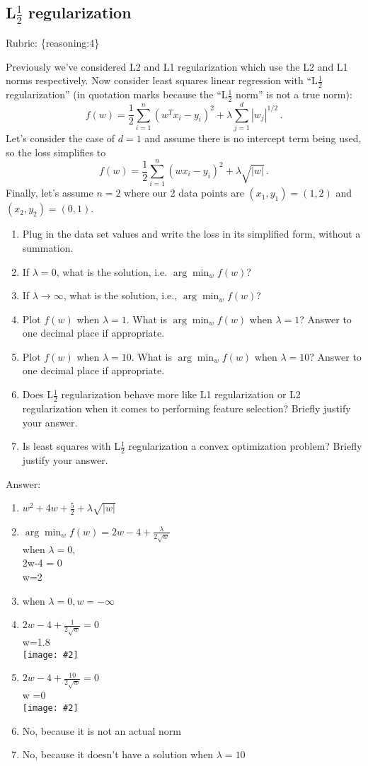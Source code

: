 \documentclass{article}
\def\rubric#1{\gre{Rubric: \{#1\}}}{}
\def\ans#1{\par\gre{Answer: #1}}
\def\gre#1{{\color{gre}#1}}
\newcommand{\fig}[2]{\texttt{[image: \#2]}}
\def\enum#1{\begin{enumerate}#1\end{enumerate}}
\begin{document}
\subsection{L$\frac12$ regularization}
\rubric{reasoning:4}

Previously we've considered L2 and L1 regularization which use the L2 and L1 norms respectively. Now consider
least squares linear regression with ``L$\frac12$ regularization'' (in quotation marks because the ``L$\frac12$ norm'' is not a true norm):
\[
f(w) = \frac{1}{2} \sum_{i=1}^n (w^Tx_i - y_i)^2 + \lambda \sum_{j=1}^d |w_j|^{1/2} \, .
\]
Let's consider the case of $d=1$ and
assume  there is no intercept term being used, so the loss simplifies to
\[
f(w) = \frac{1}{2} \sum_{i=1}^n (wx_i - y_i)^2 + \lambda \sqrt{|w|} \, .
\]
Finally, let's assume $n=2$
where our 2 data points are $(x_1,y_1)=(1,2)$ and $(x_2,y_2)=(0,1)$. 

\begin{enumerate}
\item Plug in the data set values and write the loss in its simplified form, without a summation.
\item If $\lambda=0$, what is the solution, i.e. $\arg \min_w f(w)$?
\item If $\lambda\rightarrow \infty$, what is the solution, i.e., $\arg \min_w f(w)$?
\item Plot $f(w)$ when $\lambda = 1$. What is $\arg \min_w f(w)$ when $\lambda=1$? Answer to one decimal place if appropriate.
\item Plot $f(w)$ when $\lambda = 10$. What is $\arg \min_w f(w)$ when $\lambda=10$? Answer to one decimal place if appropriate.
\item Does L$\frac12$ regularization behave more like L1 regularization or L2 regularization
when it comes to performing feature selection? Briefly justify your answer.
\item Is least squares with L$\frac12$ regularization 
a convex optimization problem? Briefly justify your answer.
\end{enumerate}


\ans{\enum{
		\item{$w^2+4w+\frac{5}{2}+\lambda\sqrt{|w|}$}
		\item{$\arg \min_w f(w) = 2w-4 + \frac{\lambda}{2\sqrt{w}}$\\
			when $\lambda=0$, \\
			2w-4 = 0\\
			w=2}
		\item{when $\lambda=0 , w=-\infty$}
		\item{$2w-4 + \frac{1}{2\sqrt{w}}= 0$\\
			w=1.8}\\
		\fig{1}{../figs/4}
		\item{$2w-4 + \frac{10}{2\sqrt{w}}= 0$\\
			w =0}\\
		\fig{1}{../figs/5}
		\item{No, because it is not an actual norm}
		\item{No, because it doesn't have a solution when $\lambda=10$}		
	}
}
\end{document}
